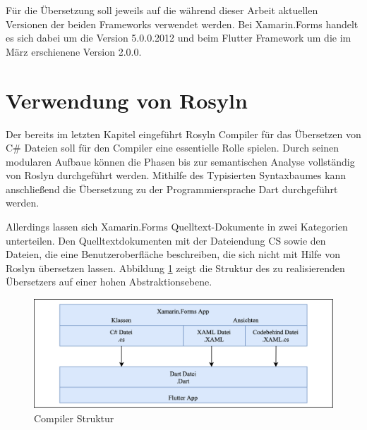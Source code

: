 Für die Übersetzung soll jeweils auf die während dieser Arbeit aktuellen Versionen der beiden Frameworks verwendet werden.  Bei Xamarin.Forms handelt es sich dabei um die Version 5.0.0.2012 und beim Flutter Framework um die im März erschienene Version 2.0.0.


\section{Verwendung von Rosyln}
Der bereits im letzten Kapitel eingeführt Rosyln Compiler für das Übersetzen von C\# Dateien soll für den Compiler eine essentielle Rolle spielen.  Durch seinen modularen Aufbaue können die Phasen bis zur semantischen Analyse vollständig von Roslyn durchgeführt werden.  Mithilfe des Typisierten Syntaxbaumes kann anschließend die Übersetzung zu der Programmiersprache Dart durchgeführt werden.  

Allerdings lassen sich Xamarin.Forms Quelltext-Dokumente in zwei Kategorien unterteilen.  Den Quelltextdokumenten mit der Dateiendung CS sowie den Dateien,  die eine Benutzeroberfläche beschreiben,  die sich nicht mit Hilfe von Roslyn übersetzen lassen.  Abbildung \ref{fig:CompilerStruktur} zeigt die Struktur des zu realisierenden Übersetzers auf einer hohen Abstraktionsebene.
\begin{figure}[!ht]
 \includegraphics[width=14.5cm]{Images/Compiler/CompilerArchitecture.png}
 \caption{Compiler Struktur}
 \label{fig:CompilerStruktur}
\end{figure}


